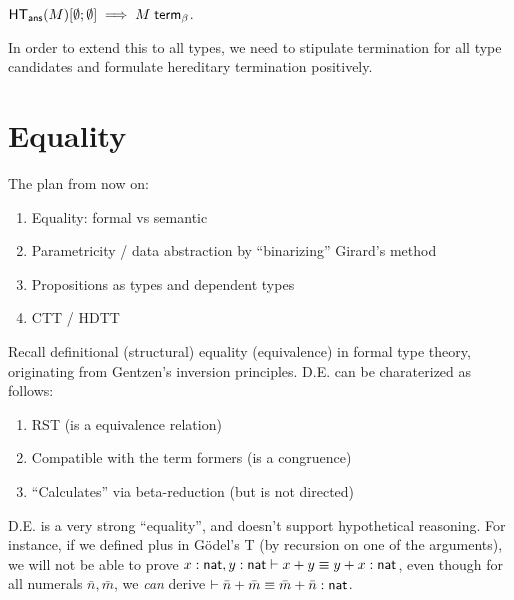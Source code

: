 \documentclass{article}
\begin{document}
\begin{corollary}
$\mathsf{HT}_{\mathsf{ans}}(M)[\emptyset;\emptyset] \implies {M} \; \mathsf{term}_{\beta}$.
\end{corollary}

In order to extend this to all types, we need to stipulate termination for all type candidates and formulate hereditary
termination positively. 

\section{Equality}

The plan from now on:
\begin{enumerate}
\item Equality: formal vs semantic
\item Parametricity / data abstraction by ``binarizing'' Girard's method
\item Propositions as types and dependent types
\item CTT / HDTT
\end{enumerate}

Recall definitional (structural) equality (equivalence) in formal type theory, originating from Gentzen's inversion 
principles. D.E. can be charaterized as follows:
\begin{enumerate}
\item RST (is a equivalence relation)
\item Compatible with the term formers (is a congruence)
\item ``Calculates'' via beta-reduction (but is not directed)
\end{enumerate}

D.E. is a very strong ``equality'', and doesn't support hypothetical reasoning. For instance, if we defined plus in 
G{\"o}del's T (by recursion on one of the arguments), 
we will not be able to prove $x : \mathsf{nat}, y : \mathsf{nat} \vdash x + y \equiv y + x : \mathsf{nat}$, even though for all numerals
$\bar n, \bar m$, we \emph{can} derive $ \vdash \bar n + \bar m \equiv \bar m + \bar n : \mathsf{nat}$.


\end{document}
